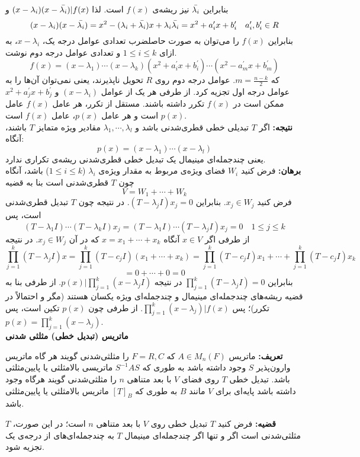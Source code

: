 بنابراین $\Bar{\lambda_i}$ نیز ریشه‌ی $f(x)$ است. لذا $(x-\lambda_i)(x-\Bar{\lambda_i})| f(x)$ و
$$(x-\lambda_i)(x-\Bar{\lambda_i}) = x^2 - (\lambda_i+\Bar{\lambda_i})x + \lambda_i\Bar{\lambda_i} = x^2 + a_i^\prime x + b_i^\prime \quad a_i^\prime , b_i^\prime \in R$$
بنابراین $f(x)$ را می‌توان به صورت حاصلضرب تعدادی عوامل درجه یک، $x-\lambda_i$، به ازای $1\leq i \leq k$ و تعدادی عوامل درجه دوم نوشت.
$$f(x) = (x-\lambda_1)\cdots (x-\lambda_k)(x^2+ a_i^\prime x+ b_i^\prime)\cdots (x^2 - a_m^\prime x+ b_m^\prime)$$
که $m = \frac{n-k}{2}$. عوامل درجه دوم روی $R$ تحویل ناپذیرند، یعنی نمی‌توان آن‌ها را به عوامل درجه اول تجزیه کرد. از طرفی هر یک از عوامل $(x-\lambda_i)$ و $x^2+ a_j^\prime x + b_j^\prime$ ممکن است در $f(x)$ تکرر داشته باشند. مستقل از تکرر، هر عامل $f(x)$ عامل $p(x)$ است و هر عامل $p(x)$، عامل $f(x)$ است.\\
\textbf{نتیجه:} اگر $T$ تبدیلی خطی قطری‌شدنی باشد و $\lambda_1 , \cdots, \lambda_l$ مقادیر ویژه متمایز $T$ باشند، آنگاه:
$$p(x) = (x-\lambda_1)\cdots(x-\lambda_l)$$
یعنی چند‌جمله‌ای مینیمال یک تبدیل خطی قطری‌شدنی ریشه‌ی تکراری ندارد.\\
\textbf{برهان:} فرض کنید $W_i$ فضای ویژه‌ی مربوط به مقدار ویژه‌ی $\lambda_i$ ($1\leq i \leq k$) باشد، آنگاه چون $T$ قطری‌شدنی است بنا به قضیه 
$$V = W_1+\cdots+ W_k$$
فرض کنید $x_j\in W_j$. بنابراین $(T-\lambda_jI)x_j=0$. در نتیجه چون $T$ تبدیل قطری‌شدنی است، پس
$$(T-\lambda_1I)\cdots(T-\lambda_kI)x_j = (T-\lambda_1I)\cdots(T-\lambda_jI)x_j = 0 \quad 1\leq j \leq k$$
از طرفی اگر $x\in V$ آنگاه $x = x_1+ \cdots+x_k$ که در آن $x_j\in W_j$. در نتیجه 
$$\prod_{j=1}^{k} (T - \lambda_jI)x = \prod_{j=1}^k(T-c_jI)(x_1+\cdots+x_k) = \prod_{j=1}^k(T-c_jI)x_1+ \cdots+ \prod_{j=1}^k(T-c_jI)x_k$$
$$=0+\cdots+0 = 0$$
بنابراین $\prod_{j=1}^k(T-\lambda_jI) = 0$ در نتیجه $p(x)|\prod_{j=1}^k(x-\lambda_jI)$. از طرفی بنا به قضیه ریشه‌های چند‌جمله‌ای مینیمال و چند‌جمله‌ای ویژه یکسان هستند (مگر و احتمالاً در تکرر)؛ پس $\prod_{j=1}^k(x-\lambda_j)|f(x)$. از طرفی چون $p(x)$ تکین است، پس $p(x) = \prod_{j=1}^k(x-\lambda_j)$.
\\
\textbf{ماتریس (تبدیل خطی) مثلثی شدنی}

\textbf{تعریف:}
ماتریس
$A \in M_n(F)$
که
$F=R,C$
را مثلثی‌شدنی گویند هر گاه ماتریس وارون‌پذیر $S$ وجود داشته باشد به طوری که $S^{-1}AS$ ماتریسی بالامثلثی یا پایین‌مثلثی باشد. تبدیل خطی $T$ روی فضای $V$ با بعد متناهی $n$ را مثلثی‌شدنی گویند هرگاه وجود داشته باشد پایه‌ای برای $V$ مانند $B$ به طوری که $[T]_B$ ماتریس بالامثلثی یا پایین‌مثلثی باشد.

\textbf{قضیه:}
فرض کنید $T$ تبدیل خطی روی $V$ با بعد متناهی $n$ است؛ در این صورت، $T$ مثلثی‌شدنی است اگر و تنها اگر چندجمله‌ای مینیمال $T$ به چندجمله‌ای‌های از درجه‌ی یک تجزیه شود.

